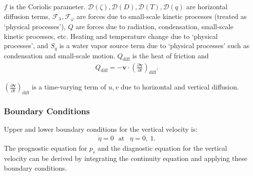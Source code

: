 $f$ is the Coriolis parameter. \({\mathcal D}(\zeta), {\mathcal D}(D), {\mathcal D}(T), {\mathcal D}(q)\)
are horizontal diffusion terms,
\({\mathcal F}_\lambda, {\mathcal F}_\varphi\) are forces due to
small-scale kinetic processes (treated as `physical processes'), \(Q\)
are forces due to radiation, condensation, small-scale kinetic
processes, etc. Heating and temperature change due to `physical
processes', and \(S_q\) is a water vapor source term due to `physical
processes' such as condensation and small-scale motion. \(Q_{\mathrm{diff}}\) is
the heat of friction and
\begin{eqnarray}
  Q_{\mathrm{diff}}
 = - {\mathbf{v}} \cdot  \left( \frac{\partial {\mathbf{v}}}{\partial t} \right)_{\mathrm{diff}} .
\end{eqnarray}

\(( \frac{\partial {\mathbf{v}}}{\partial t} )_{\mathrm{diff}}\) is a
time-varying term of \(u,v\) due to horizontal and vertical diffusion.

\hypertarget{boundary-conditions}{%
\subsubsection{Boundary Conditions}\label{boundary-conditions}}

Upper and lower boundary conditions for the vertical velocity is:
\begin{eqnarray}
  \dot{\eta} = 0  \ \ \ \text{at~} \ \ \eta = 0 , \ 1 .
\end{eqnarray}
The prognostic equation for \(p_s\) and the diagnostic equation for the
vertical velocity can be derived by integrating the continuity equation
and applying these boundary conditions.
